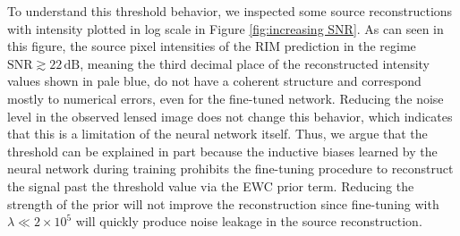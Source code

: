

To understand this threshold behavior, 
we inspected some source reconstructions with intensity plotted in log scale 
in Figure \ref{fig:increasing SNR}. As can seen in this figure, the source pixel intensities of the 
RIM prediction in the regime $\mathrm{SNR} \gtrsim 22\,\mathrm{dB}$, meaning the third decimal place of the reconstructed 
intensity values shown in pale blue, do not have a coherent structure and 
correspond mostly to numerical errors, even for the fine-tuned network. Reducing the noise 
level in the observed lensed image does not change this behavior, which indicates that this is a limitation 
of the neural network itself. Thus, we argue that the threshold can be explained in part because 
the inductive biases learned by the neural network during training prohibits the fine-tuning 
procedure to reconstruct the signal past the threshold value via the EWC prior term. Reducing the 
strength of the prior will not improve the reconstruction since fine-tuning with
$\lambda \ll 2\times 10^5$ will quickly produce noise leakage in the source reconstruction.

